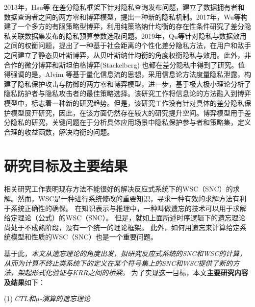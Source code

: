2013年，Hsu等\cite{hsu2013differential} 在差分隐私框架下针对隐私查询发布问题，建立了数据拥有者和数据查询者之间的两方零和博弈模型，提出一种新的隐私机制。2017年，Wu等\cite{Wu2017Game}构建了一个多方的有限策略型博弈，利用纯策略纳什均衡的存在性条件\cite{Glicksberg1952A}研究了差分隐私关联数据集发布的隐私预算参数选取问题。2019年，Qu等\cite{cui2019improving}针对隐私与数据效用之间的权衡问题，提出了一种基于社会距离的个性化差分隐私方法，在用户和敌手之间建立了静态贝叶斯博弈，从贝叶斯纳什均衡的角度权衡隐私与效用。此外，非合作的微分博弈\cite{gao2019a}和斯坦伯格博弈(Stackelberg)\cite{fioretto2020differential,shokri2015privacy} 也都在差分隐私中得到了研究。值得强调的是，Alvim 等\cite{alvim2017information,alvim2018leakage}基于量化信息流的思想，采用信息论方法度量隐私泄露，构建了隐私保护攻击与防御的两方零和博弈模型，进一步，基于极大极小理论\cite{du1995minimax}分析了隐私防护者与隐私攻击者的最佳策略选择。该研究工作将信息论的方法融入到博弈模型中，标志着一种新的研究趋势。但是，该研究工作没有针对具体的差分隐私保护模型展开研究，因此，在该方面仍然存在较大的研究提升空间。博弈模型用于差分隐私的研究，关键问题在于分析具体应用场景中隐私保护参与者和策略集，定义合理的收益函数，解决均衡的问题。

\section{研究目标及主要结果}

相关研究工作表明现存方法不能很好的解决反应式系统下的WSC（SNC）的求解。然而，WSC是一种进行系统修改的重要知识，寻求一种有效的求解方法有利于系统正确性的确保。
在知识表示与推理中，一种叫做遗忘的技术可以用于求解给定理论（公式）的WSC（SNC）。
但是，就如上面所述时序逻辑下的遗忘理论尚处于不成熟阶段，没有一个统一的理论框架。
此外，如何用遗忘来计算给定系统模型和性质的WSC（SNC）也是一个重要问题。

基于此，{\em 本文从遗忘理论的角度出发，拟研究反应式系统的SNC和WSC的计算，从而为计算不终止类系统下的定义在某个符号集上的SNC和WSC提供了新的方法，架起形式化验证与KRR之间的桥梁。}
为了实现这一目标，本文\textbf{主要研究内容及结果}如下：

(1) {\em $CTL$和$\mu$-演算的遗忘理论}

